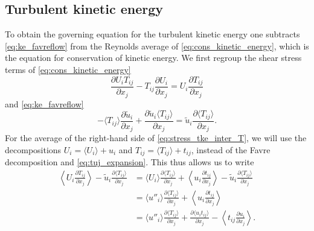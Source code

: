 \documentclass[oneside,a4paper,11pt]{report}
\newcommand{\uiavg}{\langle U_i \rangle}
\newcommand{\uifluc}{u_i}
\newcommand{\uavgf}{\widetilde{u}}
\newcommand{\uflucf}{u''}
\begin{document}
\subsection{Turbulent kinetic energy}
To obtain the governing equation for the turbulent kinetic energy one subtracts \cref{eq:ke_favreflow} from the Reynolds average of \cref{eq:cons_kinetic_energy}, which is the equation for conservation of kinetic energy. We first regroup the shear stress terms of \cref{eq:cons_kinetic_energy}  
\begin{equation}
\label{eq:stress_tke_inter_T}
     \frac{\partial U_i T_{ij} }{\partial x_j} - T_{ij} \frac{\partial U_i}{\partial x_j} =  U_i \frac{\partial T_{ij} }{\partial x_j}
\end{equation}
and \cref{eq:ke_favreflow}
\begin{equation}
     -\langle T_{ij} \rangle \frac{ \partial \uavgf_i}{\partial x_j} + \frac{ \partial \uavgf_i \langle T_{ij} \rangle }{\partial x_j} = \uavgf_i \frac{ \partial \langle T_{ij} \rangle}{\partial x_j}.
\end{equation}
For the average of the right-hand side of \cref{eq:stress_tke_inter_T}, we will use the decompositions $U_i = \uiavg + \uifluc$ and $T_{ij} = \langle T_{ij} \rangle + t_{ij}$, instead of the Favre decomposition and \cref{eq:tuj_expansion}. This thus allows us to write 
\begin{align}
\left < U_i \frac{\partial T_{ij} }{\partial x_j} \right > - \uavgf_i \frac{ \partial \langle T_{ij} \rangle}{\partial x_j} & = \uiavg \frac{\partial \langle T_{ij} \rangle}{\partial x_j} + \left < \uifluc \frac{\partial t_{ij}}{\partial x_j} \right > - \uavgf_i \frac{\partial \langle T_{ij} \rangle}{\partial x_j} \nonumber \\
& = \langle \uflucf_i \rangle \frac{\partial \langle T_{ij} \rangle}{\partial x_j} + \left < \uifluc \frac{\partial t_{ij}}{\partial x_j} \right > \nonumber \\
& = \langle \uflucf_i \rangle \frac{\partial \langle T_{ij} \rangle}{\partial x_j} + \frac{\partial \langle u_i t_{ij} \rangle}{\partial x_j} - \left <t_{ij} \frac{\partial u_i}{\partial x_j} \right >.
\end{align} 
\end{document}
